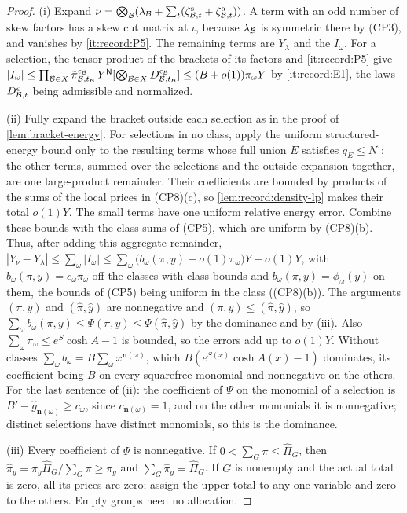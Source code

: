 \begin{proof}
(i) Expand $\nu=\bigotimes_\mathcal B(\lambda_\mathcal B+\sum_t(\zeta^{\rm s}_{\mathcal B,t}+\zeta^{\rm a}_{\mathcal B,t}))$.
A term with an odd number of skew factors has a skew cut matrix at $\iota$,
because $\lambda_\mathcal B$ is symmetric there by (CP3), and vanishes by
\ref{it:record:P5}. The remaining terms are $Y_\lambda$ and the $I_\omega$.
For a selection, the tensor product of the brackets of its factors and
\ref{it:record:P5} give $|I_\omega|\le\prod_{\mathcal B\in X}
\tilde\pi^{\epsilon_\mathcal B}_{\mathcal B,t_\mathcal B}\,Y^{\mathsf N}[\bigotimes_{\mathcal B\in X}
D^{\epsilon_\mathcal B}_{\mathcal B,t_\mathcal B}]\le(B+o(1))\pi_\omega Y$ by \ref{it:record:E1}, the
laws $D^\epsilon_{\mathcal B,t}$ being admissible and normalized.

(ii) Fully expand the bracket outside each selection as in the proof of
\cref{lem:bracket-energy}. For selections in no class, apply the uniform
structured-energy bound only to the resulting terms whose full union
$E$ satisfies $q_E\le N^\tau$; the other terms, summed over the selections
and the outside expansion together, are one large-product remainder.
Their coefficients are bounded by products of the sums of the local
prices in (CP8)(c), so \cref{lem:record:density-lp} makes their total
$o(1)Y$. The small terms have one uniform relative energy error.
Combine these bounds with the class sums of (CP5), which are uniform
by (CP8)(b). Thus, after adding this aggregate remainder,
$|Y_\nu-Y_\lambda|\le\sum_\omega|I_\omega|\le\sum_\omega\bigl(b_\omega(\pi,y)
+o(1)\pi_\omega\bigr)Y+o(1)Y$, with $b_\omega(\pi,y)=c_\omega\pi_\omega$ off the classes
with class bounds and $b_\omega(\pi,y)=\phi_\omega(y)$ on them, the bounds of
(CP5) being uniform in the class ((CP8)(b)). The arguments $(\pi,y)$ and
$(\hat\pi,\hat y)$ are nonnegative and $(\pi,y)\le(\hat\pi,\hat y)$, so
$\sum_\omega b_\omega(\pi,y)\le\Psi(\pi,y)\le\Psi(\hat\pi,\hat y)$ by the
dominance and by (iii). Also $\sum_\omega\pi_\omega\le e^S\cosh A-1$ is
bounded, so the errors add up to $o(1)Y$. Without classes
$\sum_\omega b_\omega=B\sum_\omega x^{\boldsymbol n(\omega)}$, which
$B(e^{S(x)}\cosh A(x)-1)$ dominates, its coefficient being $B$ on every
squarefree monomial and nonnegative on the others. For the last
sentence of (ii): the coefficient of $\Psi$ on the monomial of a selection is
$B'-\hat g_{\boldsymbol n(\omega)}\ge c_\omega$, since
$c_{\boldsymbol n(\omega)}=1$, and on the other monomials it is nonnegative;
distinct selections have distinct monomials, so this is the dominance.

(iii) Every coefficient of $\Psi$ is nonnegative. If
$0<\sum_G\pi\le\hat\Pi_G$, then
$\hat\pi_g=\pi_g\hat\Pi_G/\sum_G\pi\ge\pi_g$ and
$\sum_G\hat\pi_g=\hat\Pi_G$. If $G$ is nonempty and the actual total
is zero, all its prices are zero; assign the upper total to any one variable
and zero to the others. Empty groups need no allocation.


\end{proof}
